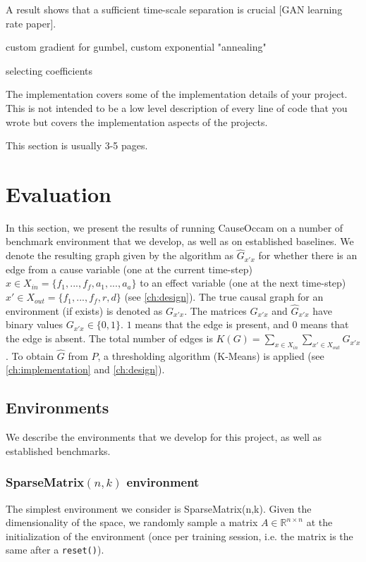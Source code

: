 \documentclass[a4paper,11pt,oneside]{report}
\newcommand{\sysname}{CauseOccam\xspace}
\begin{document}
A result shows that a sufficient time-scale separation is crucial [GAN learning rate paper].

custom gradient for gumbel, custom exponential "annealing"

selecting coefficients

The implementation covers some of the implementation details of your project.
This is not intended to be a low level description of every line of code that
you wrote but covers the implementation aspects of the projects.

This section is usually 3-5 pages.


\chapter{Evaluation}
\label{ch:evaluation}
In this section, we present the results of running \sysname on a number of benchmark environment that we develop, as well as on established baselines.
We denote the resulting graph given by the algorithm as $\hat{G}_{x'x}$ for whether there is an edge from a cause variable (one at the current time-step) $x\in X_{in}=\{f_1,...,f_f,a_1,...,a_a\}$ to an effect variable (one at the next time-step) $x'\in X_{out}=\{f_1,...,f_f,r,d\}$ (see \autoref{ch:design}). The true causal graph for an environment (if exists) is denoted as $G_{x'x}$. The matrices $G_{x'x}$ and $\hat{G}_{x'x}$ have binary values $G_{x'x}\in\{0,1\}$. $1$ means that the edge is present, and $0$ means that the edge is absent. The total number of edges is $K(G)=\sum\limits_{x\in X_{in}}\sum\limits_{x'\in X_{out}}G_{x'x}$. To obtain $\hat{G}$ from $P$, a thresholding algorithm (K-Means) is applied (see \autoref{ch:implementation} and \autoref{ch:design}).

\section{Environments}
We describe the environments that we develop for this project, as well as established benchmarks.

\subsection{SparseMatrix$(n,k)$ environment}
The simplest environment we consider is SparseMatrix(n,k). Given the dimensionality of the space, we randomly sample a matrix $A\in \mathbb R^{n\times n}$ at the initialization of the environment (once per training session, i.e. the matrix is the same after a {\tt reset()}).
\end{document}
